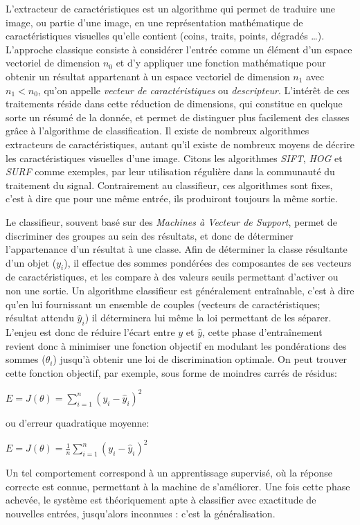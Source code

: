 			L'extracteur de caractéristiques est un algorithme qui permet de traduire une image, ou partie d'une image, en une représentation mathématique de caractéristiques visuelles qu'elle contient (coins, traits, points, dégradés \dots). L'approche classique consiste à considérer l'entrée comme un élément d'un espace vectoriel de dimension $n_{0}$ et d'y appliquer une fonction mathématique pour obtenir un résultat appartenant à un espace vectoriel de dimension $n_{1}$ avec $n_{1} < n_{0}$, qu'on appelle \emph{vecteur de caractéristiques} ou \emph{descripteur}. L'intérêt de ces traitements réside dans cette réduction de dimensions, qui constitue en quelque sorte un résumé de la donnée, et permet de distinguer plus facilement des classes grâce à l'algorithme de classification. Il existe de nombreux algorithmes extracteurs de caractéristiques, autant qu'il existe de nombreux moyens de décrire les caractéristiques visuelles d'une image. Citons les algorithmes \emph{SIFT}\cite{sift}, \emph{HOG}\cite{hog} et \emph{SURF}\cite{surf} comme exemples, par leur utilisation régulière dans la communauté du traitement du signal. Contrairement au classifieur, ces algorithmes sont fixes, c'est à dire que pour une même entrée, ils produiront toujours la même sortie.
			\par
			Le classifieur, souvent basé sur des \emph{Machines à Vecteur de Support}\cite{svm}, permet de discriminer des groupes au sein des résultats, et donc de déterminer l'appartenance d'un résultat à une classe. Afin de déterminer la classe résultante d'un objet ($y_{i}$), il effectue des sommes pondérées des composantes de ses vecteurs de caractéristiques, et les compare à des valeurs seuils permettant d'activer ou non une sortie. Un algorithme classifieur est généralement entraînable, c'est à dire qu'en lui fournissant un ensemble de couples (vecteurs de caractéristiques; résultat attendu $\hat{y}_{i}$) il déterminera lui même la loi permettant de les séparer. L'enjeu est donc de réduire l'écart entre $y$ et $\hat{y}$, cette phase d'entraînement revient donc à minimiser une fonction objectif en modulant les pondérations des sommes ($\theta_{i}$) jusqu'à obtenir une loi de discrimination optimale. On peut trouver cette fonction objectif, par exemple, sous forme de moindres carrés de résidus:
			\begin{center} $ E = J({\theta}) =  \sum\limits_{i=1}^{n} (y_{i} - \hat{y}_{i} )^2 $ \end{center}
			ou d'erreur quadratique moyenne:
			\begin{center} $ E = J({\theta}) =  \frac{1}{n}\sum\limits_{i=1}^{n} (y_{i} - \hat{y}_{i})^2 $ \end{center}
			Un tel comportement correspond à un apprentissage supervisé, où la réponse correcte est connue, permettant à la machine de s'améliorer. Une fois cette phase achevée, le système est théoriquement apte à classifier avec exactitude de nouvelles entrées, jusqu'alors inconnues : c'est la généralisation.

